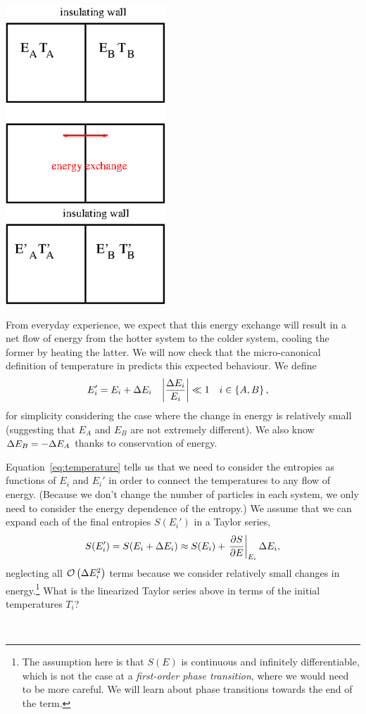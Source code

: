 \begin{center}
  \includegraphics[width=0.45\textwidth]{figs/week02_heat-exchange.pdf}
\end{center}

From everyday experience, we expect that this energy exchange will result in a net flow of energy from the hotter system to the colder system, cooling the former by heating the latter.
We will now check that the micro-canonical definition of temperature in  predicts this expected behaviour.
We define
\begin{align*}
  E_i' & = E_i + \Delta E_i &
  \left|\frac{\Delta E_i}{E_i}\right| & \ll 1 &
  i & \in \left\{A, B\right\},
\end{align*}
for simplicity considering the case where the change in energy is relatively small (suggesting that $E_A$ and $E_B$ are not extremely different).
We also know $\Delta E_B = -\Delta E_A$ thanks to conservation of energy.

Equation~\ref{eq:temperature} tells us that we need to consider the entropies as functions of $E_i$ and $E_i'$ in order to connect the temperatures to any flow of energy.
(Because we don't change the number of particles in each system, we only need to consider the energy dependence of the entropy.)
We assume that we can expand each of the final entropies $S(E_i')$ in a Taylor series,
\begin{equation*}
  S(E_i') = S(E_i + \Delta E_i) \approx S(E_i) + \left.\frac{\partial S}{\partial E}\right|_{E_i} \Delta E_i,
\end{equation*}
neglecting all $\mathcal O\left(\Delta E_i^2\right)$ terms because we consider relatively small changes in energy.\footnote{The assumption here is that $S(E)$ is continuous and infinitely differentiable, which is not the case at a \textit{first-order phase transition}, where we would need to be more careful.  We will learn about phase transitions towards the end of the term.}
What is the linearized Taylor series above in terms of the initial temperatures $T_i$?
\begin{mdframed}
  \ \\[50 pt]
\end{mdframed}

